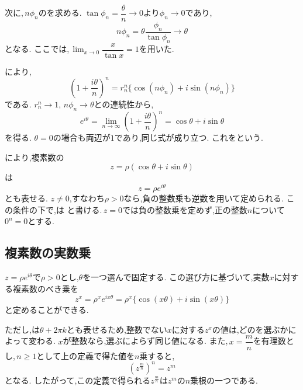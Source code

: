     次に,\,$n\phi_n$のを求める.
    $\tan\phi_n=\dfrac{\theta}{n}\to0$より$\phi_n\to0$であり,
    \[
      n\phi_n
      =
      \theta\frac{\phi_n}{\tan\phi_n}
      \longrightarrow\theta
    \]
    となる.
    ここでは,\,$\lim_{x\to0}\dfrac{x}{\tan x}=1$を用いた.

    により,
    \[
      \left(1+\frac{i\theta}{n}\right)^n
      =
      r_n^n
      \{\cos(n\phi_n)+i\sin(n\phi_n)\}
    \]
    である.
    $r_n^n\to1,\,n\phi_n\to\theta$との連続性から,
    \[
      e^{i\theta}
      =
      \lim_{n\to\infty}
      \left(1+\frac{i\theta}{n}\right)^n
      =
      \cos\theta+i\sin\theta
    \]
    を得る.
    $\theta=0$の場合も両辺が$1$であり,同じ式が成り立つ.
    これをという.

    により,複素数の
    \[
      z=\rho(\cos\theta+i\sin\theta)
    \]
    は
    \[
      z=\rho e^{i\theta}
    \]
    とも表せる.
    $z\ne0$,すなわち$\rho>0$なら,負の整数乗も逆数を用いて定められる.
    この条件の下で,は
\BookMathLayout{\[
      z^n
      =
      \rho^n e^{in\theta}
      =
      \rho^n\{\cos(n\theta)+i\sin(n\theta)\}
      \qquad(n\in\mathbb Z)
    \]}{
\[
\begin{aligned}
z^n&=\rho^n e^{in\theta}\\
&=\rho^n\{\cos(n\theta)+i\sin(n\theta)\}\\
&\hspace{5zw}(n\in\mathbb Z)
\end{aligned}
\]
}
    と書ける.\,$z=0$では負の整数乗を定めず,正の整数$n$について$0^n=0$とする.

  \subsection{複素数の実数乗}\label{節：複素数の実数乗}
    $z=\rho e^{i\theta}$で$\rho>0$とし,$\theta$を一つ選んで固定する.
    この選び方に基づいて,実数$x$に対する複素数のべき乗を
    \[
      z^x=\rho^x e^{ix\theta}
      =
      \rho^x\{\cos(x\theta)+i\sin(x\theta)\}
    \]
    と定めることができる.

    ただし,は$\theta+2\pi k$とも表せるため,整数でない$x$に対する$z^x$の値は,どのを選ぶかによって変わる.
    $x$が整数なら,選ぶによらず同じ値になる.
    また,\,$x=\dfrac{m}{n}$を有理数とし,\,$n\ge1$として上の定義で得た値を$n$乗すると,
    \[
      (z^{\frac{m}{n}})^n=z^m
    \]
    となる.
    したがって,この定義で得られる$z^{\displaystyle \frac{m}{n}}$は$z^m$の$n$乗根の一つである.

